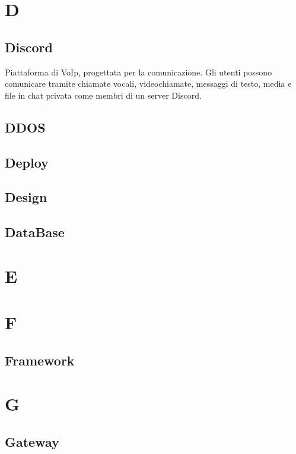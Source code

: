 \documentclass{classes/base}
\begin{document}
    \section*{D}
       
        \subsection*{Discord}
        Piattaforma di VoIp, progettata per la comunicazione. Gli utenti possono comunicare tramite chiamate vocali, videochiamate, messaggi di testo, media e file in chat privata come membri di un server Discord.

        \subsection*{DDOS}

        \subsection*{Deploy}

        \subsection*{Design}

        \subsection*{DataBase}
        \newpage  
    \section*{E}
    \newpage  
    \section*{F}
        \subsection*{Framework}
        \newpage  
    \section*{G}
        
        \subsection*{Gateway}
\end{document}
